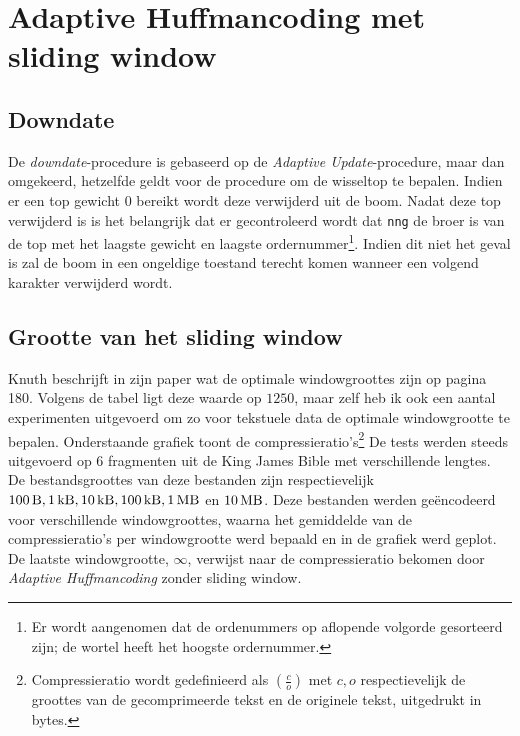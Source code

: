\section{Adaptive Huffmancoding met sliding window}

\subsection{Downdate}
De \emph{downdate}-procedure is gebaseerd op de \emph{Adaptive Update}-procedure, maar dan omgekeerd, hetzelfde geldt voor de procedure om de wisseltop te bepalen. Indien er een top gewicht $0$ bereikt wordt deze verwijderd uit de boom. Nadat deze top verwijderd is is het belangrijk dat er gecontroleerd wordt dat \texttt{nng} de broer is van de top met het laagste gewicht en laagste ordernummer\footnote{Er wordt aangenomen dat de ordenummers op aflopende volgorde gesorteerd zijn; de wortel heeft het hoogste ordernummer.}. Indien dit niet het geval is zal de boom in een ongeldige toestand terecht komen wanneer een volgend karakter verwijderd wordt. 

\subsection{Grootte van het sliding window}
Knuth beschrijft in zijn paper \cite{knuthhuffman} wat de optimale windowgroottes zijn op pagina 180. Volgens de tabel ligt deze waarde op $1250$, maar zelf heb ik ook een aantal experimenten uitgevoerd om zo voor tekstuele data de optimale windowgrootte te bepalen. Onderstaande grafiek toont de compressieratio's\footnote{Compressieratio wordt gedefinieerd als $(\frac{c}{o})$ met $c,o$ respectievelijk de groottes van de gecomprimeerde tekst en de originele tekst, uitgedrukt in bytes.} De tests werden steeds uitgevoerd op 6 fragmenten uit de King James Bible \cite{gutenbergbible} met verschillende lengtes. De bestandsgroottes van deze bestanden zijn respectievelijk $\SI{100}{\byte}, \SI{1}{\kilo\byte}, \SI{10}{\kilo\byte}, \SI{100}{\kilo\byte}, \SI{1}{\mega\byte}$ en $\SI{10}{\mega\byte}$. Deze bestanden werden ge\"encodeerd voor verschillende windowgroottes, waarna het gemiddelde van de compressieratio's per windowgrootte werd bepaald en in de grafiek werd geplot. De laatste windowgrootte, $\infty$, verwijst naar de compressieratio bekomen door \emph{Adaptive Huffmancoding} zonder sliding window.